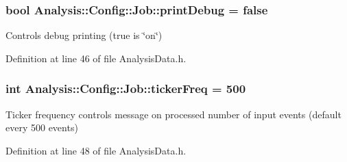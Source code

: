 \subsubsection[{\texorpdfstring{print\+Debug}{printDebug}}]{\setlength{\rightskip}{0pt plus 5cm}bool Analysis\+::\+Config\+::\+Job\+::print\+Debug = false\hspace{0.3cm}{\ttfamily [static]}}\hypertarget{namespaceAnalysis_1_1Config_1_1Job_aabd902531ff651c92a08fa9f986e2046}{}\label{namespaceAnalysis_1_1Config_1_1Job_aabd902531ff651c92a08fa9f986e2046}


Controls debug printing ({\ttfamily true} is \char`\"{}on\char`\"{}) 



Definition at line 46 of file Analysis\+Data.\+h.

\subsubsection[{\texorpdfstring{ticker\+Freq}{tickerFreq}}]{\setlength{\rightskip}{0pt plus 5cm}int Analysis\+::\+Config\+::\+Job\+::ticker\+Freq = 500\hspace{0.3cm}{\ttfamily [static]}}\hypertarget{namespaceAnalysis_1_1Config_1_1Job_a5db682379b8905ddba5cc6b4093555d2}{}\label{namespaceAnalysis_1_1Config_1_1Job_a5db682379b8905ddba5cc6b4093555d2}


Ticker frequency controls message on processed number of input events (default every 500 events) 



Definition at line 48 of file Analysis\+Data.\+h.

